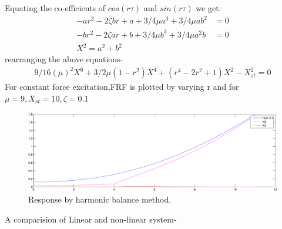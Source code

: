 Equating the co-efficients of $cos(r \tau)$ and $sin(r \tau)$ we get:
\begin{align}
-ar^2-2\zeta br+a+ 3/4\mu a^3+3/4\mu ab^2&=0 \\
-br^2-2\zeta ar+b+ 3/4\mu b^3+3/4\mu a^2b&=0\\
X^2=a^2+b^2
\end{align}
rearranging the above equations-
\begin{align}
9/16(\mu )^2X^6+3/2\mu (1-r^2)X^4+(r^4-2r^2+1)X^2-X_{st}^2=0
\end{align}
For constant force excitation,FRF is plotted by varying r and for $\mu =9 , X_{st}=10 ,\zeta=0.1 $
\begin{figure}[h!]
\includegraphics[width=\textwidth,height=0.5\textwidth]{"figures/hbm"}
\caption{Response by harmonic balance method.}
  \label{fig:hbm}
\end{figure}
A comparision of Linear and non-linear system-
